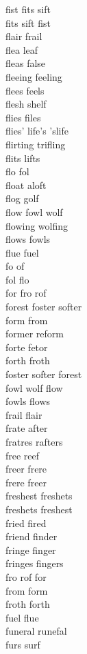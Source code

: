 fist fits sift\\
fits sift fist\\
flair frail\\
flea leaf\\
fleas false\\
fleeing feeling\\
flees feels\\
flesh shelf\\
flies files\\
flies' life's 'slife\\
flirting trifling\\
flits lifts\\
flo fol\\
float aloft\\
flog golf\\
flow fowl wolf\\
flowing wolfing\\
flows fowls\\
flue fuel\\
fo of\\
fol flo\\
for fro rof\\
forest foster softer\\
form from\\
former reform\\
forte fetor\\
forth froth\\
foster softer forest\\
fowl wolf flow\\
fowls flows\\
frail flair\\
frate after\\
fratres rafters\\
free reef\\
freer frere\\
frere freer\\
freshest freshets\\
freshets freshest\\
fried fired\\
friend finder\\
fringe finger\\
fringes fingers\\
fro rof for\\
from form\\
froth forth\\
fuel flue\\
funeral runefal\\
furs surf\\

